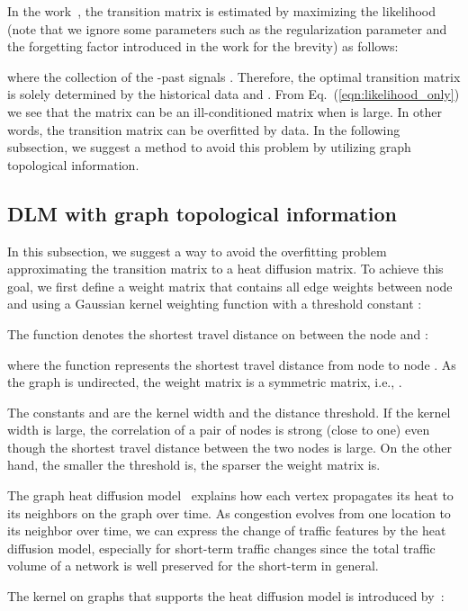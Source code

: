 \documentclass[journal]{IEEEtran}
\begin{document}
In the work~\cite{kwak2020travel}, the transition matrix is estimated by maximizing the likelihood (note that we ignore some parameters such as the regularization parameter and the forgetting factor introduced in the work for the brevity) as follows:

where the collection of the -past signals . Therefore, the optimal transition matrix is solely determined by the historical data  and . From Eq.~(\ref{eqn:likelihood_only}) we see that the matrix  can be an ill-conditioned matrix when  is large. In other words, the transition matrix  can be overfitted by data. In the following subsection, we suggest a method to avoid this problem by utilizing graph topological information.

\subsection{DLM with graph topological information}
In this subsection, we suggest a way to avoid the overfitting problem approximating the transition matrix to a heat diffusion matrix. To achieve this goal, we first define a weight matrix that contains all edge weights between node  and  using a Gaussian kernel weighting function with a threshold constant :

The function  denotes the shortest travel distance on  between the node  and :

where the function  represents the shortest travel distance from node  to node .
As the graph  is undirected, the weight matrix is a symmetric matrix, i.e., .

The constants  and  are the kernel width and the distance threshold.
If the kernel width is large, the correlation of a pair of nodes is strong (close to one) even though the shortest travel distance between the two nodes is large. 
On the other hand, the smaller the threshold is, the sparser the weight matrix is.






The graph heat diffusion model~\cite{kondor2002diffusion} explains how each vertex propagates its heat to its neighbors on the graph over time.
As congestion evolves from one location to its neighbor over time, we can express the change of traffic features by the heat diffusion model, especially for short-term traffic changes since the total traffic volume of a network is well preserved for the short-term in general.




The kernel on graphs that supports the heat diffusion model is introduced by~\cite{kondor2002diffusion}:
\end{document}
